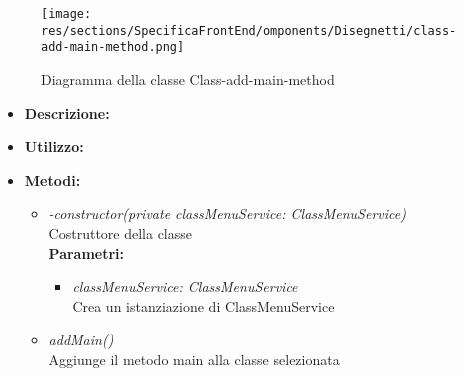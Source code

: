 \begin{figure}[h!]
	\centering
	\texttt{[image: res/sections/SpecificaFrontEnd/omponents/Disegnetti/class-add-main-method.png]}
	\caption{Diagramma della classe Class-add-main-method}
\end{figure}

\begin{itemize}
	\item \textbf{Descrizione:}\\
	
	\item \textbf{Utilizzo:}\\
	
	\item \textbf{Metodi:}
		\begin{itemize}
			\item \emph{-constructor(private classMenuService: ClassMenuService)}\\
    		Costruttore della classe\\
    		\textbf{Parametri:}
    		\begin{itemize}
    			\item \emph{classMenuService: ClassMenuService}\\
    			Crea un istanziazione di ClassMenuService
    		\end{itemize}
    		\item \emph{addMain()}\\
    		Aggiunge il metodo main alla classe selezionata
		\end{itemize}
\end{itemize}